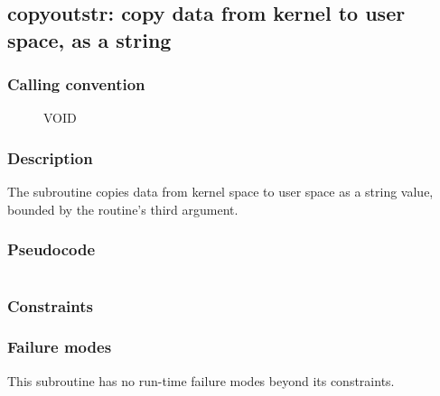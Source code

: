\clearpage
{}
{}
\label{subr:copyoutstr}
\subsection*{copyoutstr: copy data from kernel to user space, as a string}

\subsubsection*{Calling convention}

\begin{description}
\item[] VOID
\end{description}

\subsubsection*{Description}

The  subroutine copies data from kernel space
to user space as a string value, bounded by the routine's third argument.
\subsubsection*{Pseudocode}

\begin{verbatim}
\end{verbatim}

\subsubsection*{Constraints}

\subsubsection*{Failure modes}

This subroutine has no run-time failure modes beyond its constraints.
